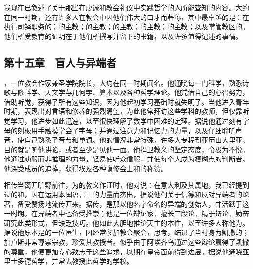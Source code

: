 我现在已叙述了关于那些在虔诚和教会礼仪中实践哲学的人所能查知的内容。大约在同一时期，还有许多人在教会中因他们伟大的口才而著称，其中最卓越的是：在执行司铎职务的；的主教；的主教；的主教；的主教；的主教；以及掌管教区的。他们所受教育的证明在于他们所撰写并留下的书籍，以及许多值得记述的事情。\par


\subsection{第十五章　盲人与异端者}

，一位教会作家兼圣学院院长，大约在同一时期闻名。他通晓每一门科学，熟悉诗歌与修辞学、天文学与几何学、算术以及各种哲学理论。他凭借自己的心智努力，借助听觉，获得了所有这些知识，因为他起初学习基础时就失明了。当他进入青年时期，表现出对言语和修养的强烈渴望，为此他常拜访这些学科的教师，但仅靠听觉学习，他进步如此迅速，以至很快理解了数学中困难的定理。据说他通过刻有字母的刻板用手触摸学会了字母；并通过注意力和记忆力的力量，以及仔细聆听声音，使自己熟悉了音节和单词。他的情况非常特殊，许多人专程到亚历山大里亚，目的就是听他讲论，或者至少是见他一面。他捍卫教义的坚定态度，令极为不悦。他通过劝服而非推理的力量，轻易使听众信服，并使每个人成为模糊点的判断者。他深受成员的追捧，获得埃及各种隐修会士和的称赞。\par

相传当离开旷野前往，为的教义作证时，他对说：在意大利及其属地，我已经提到过的和，因在运用本国语言上的力量而杰出，据说他们关于信德和反对异端者的论著，备受赞扬地流传开来。据传，是那以他名字命名的异端的创始人，并活跃于这一时期。在异端者中也备受推崇；他是一位辩证家，擅长三段论，精于辩论，勤奋研究此类形式，但缺乏技巧。他如此大胆地推论天主的本性，以至许多人称他为。据说他原本是的一位医生，因经常参加教会聚会，思考，结识了当时身为凯撒的；加卢斯非常尊崇宗教，珍爱其教授者。似乎由于阿埃齐乌通过这些辩论赢得了凯撒的尊重，他便更加专心致志于这些追求，以期在皇帝面前得到进展。据说他通晓亚里士多德哲学，并常去教授此哲学的学校。\par


